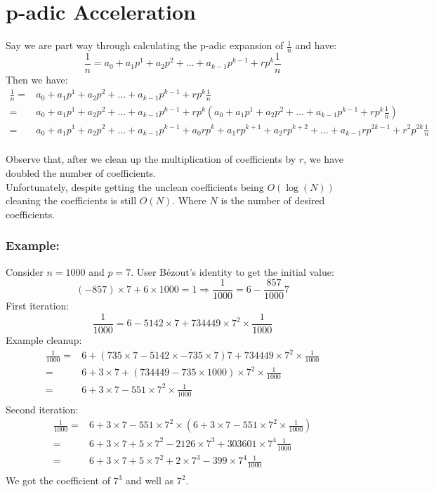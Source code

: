 
\section{p-adic Acceleration}
Say we are part way through calculating the p-adic expansion of $\frac{1}{n}$ and have:
\[\frac{1}{n} = a_0+a_1p^1+a_2p^2+\dots+a_{k-1}p^{k-1}+rp^{k}\frac{1}{n}\]
Then we have:
\begin{equation*}
\begin{aligned}
\frac{1}{n} =& a_0+a_1p^1+a_2p^2+\dots+a_{k-1}p^{k-1}+rp^{k}\frac{1}{n}\\
=& a_0+a_1p^1+a_2p^2+\dots+a_{k-1}p^{k-1}+rp^{k}\left(a_0+a_1p^1+a_2p^2+\dots+a_{k-1}p^{k-1}+rp^{k}\frac{1}{n}\right)\\
=& a_0+a_1p^1+a_2p^2+\dots+a_{k-1}p^{k-1}+a_0rp^{k}+a_1rp^{k+1}+a_2rp^{k+2}+\dots+a_{k-1}rp^{2k-1}+r^2p^{2k}\frac{1}{n}\\
\end{aligned}
\end{equation*}

Observe that,
after we clean up the multiplication of coefficients by $r$,
we have doubled the number of coefficients.
\\

Unfortunately,
despite getting the unclean coefficients being $O(\log(N))$ cleaning the coefficients is still $O(N)$.
Where $N$ is the number of desired coefficients.

\subsubsection{Example:}
Consider $n=1000$ and $p=7$.
User Bézout's identity to get the initial value:
\[(-857 )\times7+6\times1000=1\Rightarrow \frac{1}{1000} = 6-\frac{857}{1000}7\]
First iteration:
\[\frac{1}{1000}=6-5142\times7+734449\times7^2\times\frac{1}{1000}\]
Example cleanup:
\begin{equation*}
\begin{aligned}
\frac{1}{1000}=&6+(735\times7-5142\times-735\times7)7+734449\times7^2\times\frac{1}{1000}\\
=&6+3\times7+(734449-735\times1000)\times7^2\times\frac{1}{1000}\\
=&6+3\times7-551\times7^2\times\frac{1}{1000}\\
\end{aligned}
\end{equation*}
Second iteration:
\begin{equation*}
\begin{aligned}
\frac{1}{1000}=&6+3\times7-551\times7^2\times\left(6+3\times7-551\times7^2\times\frac{1}{1000}\right)\\
=&6+3\times7+5\times7^2-2126\times7^3+303601\times7^4\frac{1}{1000}\\
=&6+3\times7+5\times7^2+2\times7^3-399\times7^4\frac{1}{1000}\\
\end{aligned}
\end{equation*}
We got the coefficient of $7^3$ and well as $7^2$.

